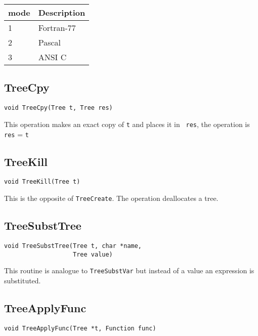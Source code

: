 \vspace{0.2cm}
\begin{center}
\begin{tabular}{ll}
\hline
  mode     & Description \\ \hline 
  1        & Fortran-77  \\  
  2        & Pascal      \\ 
  3        & ANSI C      \\
\hline
\end{tabular}
\end{center}
\vspace{0.2cm}

\subsection{TreeCpy}
\begin{verbatim}
void TreeCpy(Tree t, Tree res)
\end{verbatim}

This operation makes an exact copy of {\tt t} and places it in {\tt
  res}, \ie the operation is {\tt res} = {\tt t}

\subsection{TreeKill}
\begin{verbatim}
void TreeKill(Tree t)
\end{verbatim}

This is the opposite of {\tt TreeCreate}. The operation deallocates a
tree. 

\subsection{TreeSubstTree}
\begin{verbatim}
void TreeSubstTree(Tree t, char *name,
                   Tree value)
\end{verbatim}

This routine is analogue to {\tt TreeSubstVar} but instead of a value
an expression is substituted.

\subsection{TreeApplyFunc}
\begin{verbatim}
void TreeApplyFunc(Tree *t, Function func)
\end{verbatim}

